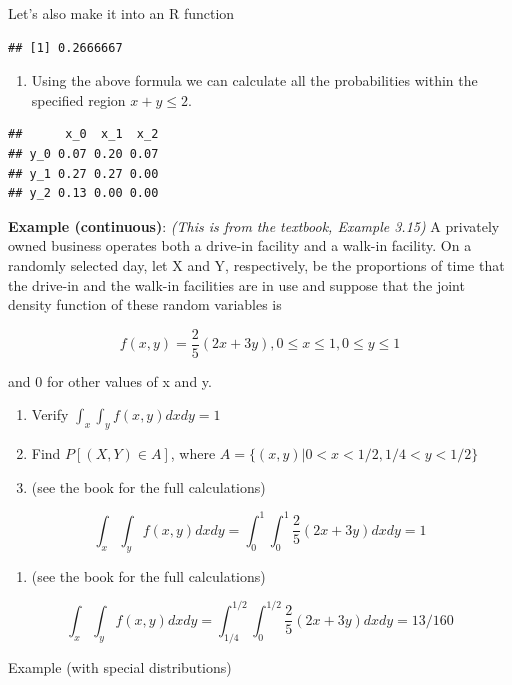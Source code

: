 \documentclass[]{book}
\providecommand{\tightlist}{%
  \setlength{\itemsep}{0pt}\setlength{\parskip}{0pt}}
\theoremstyle{definition}
\theoremstyle{definition}
\theoremstyle{definition}
\theoremstyle{remark}
\begin{document}
Let's also make it into an R function

\begin{verbatim}
## [1] 0.2666667
\end{verbatim}

\begin{enumerate}
\def\labelenumi{(\alph{enumi})}
\setcounter{enumi}{1}
\tightlist
\item
  Using the above formula we can calculate all the probabilities within
  the specified region \(x+y \le 2\).
\end{enumerate}

\begin{verbatim}
##      x_0  x_1  x_2
## y_0 0.07 0.20 0.07
## y_1 0.27 0.27 0.00
## y_2 0.13 0.00 0.00
\end{verbatim}

\textbf{Example (continuous)}: \emph{(This is from the textbook, Example
3.15)} A privately owned business operates both a drive-in facility and
a walk-in facility. On a randomly selected day, let X and Y,
respectively, be the proportions of time that the drive-in and the
walk-in facilities are in use and suppose that the joint density
function of these random variables is

\[
f(x,y) = \dfrac{2}{5}(2x + 3y), 0 \le x \le 1, 0 \le y \le 1
\]

and 0 for other values of x and y.

\begin{enumerate}
\def\labelenumi{(\alph{enumi})}
\item
  Verify \(\int_x \int_y f(x,y) dx dy = 1\)
\item
  Find \(P[(X,Y) \in A]\), where
  \(A = \{(x,y)|0 < x < 1/2, 1/4 < y < 1/2\}\)
\item
  (see the book for the full calculations)
\end{enumerate}

\[
\int_x \int_y f(x,y) dx dy = \int_0^1 \int_0^1 \dfrac{2}{5}(2x+3y) dx dy = 1
\]

\begin{enumerate}
\def\labelenumi{(\alph{enumi})}
\tightlist
\item
  (see the book for the full calculations)
\end{enumerate}

\[
\int_x \int_y f(x,y) dx dy = \int_{1/4}^{1/2} \int_0^{1/2} \dfrac{2}{5}(2x+3y) dx dy = 13/160
\]

Example (with special distributions)
\end{document}
